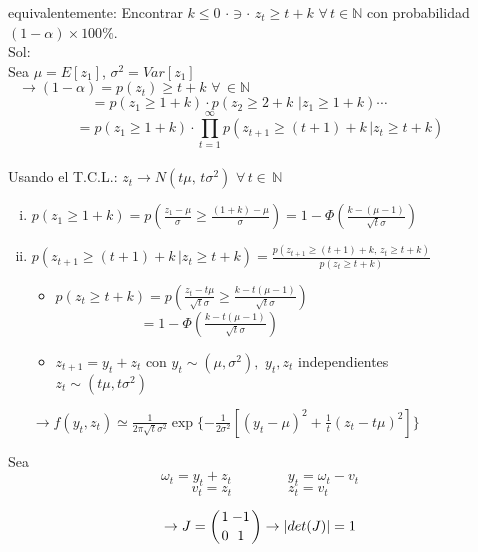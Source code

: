 equivalentemente: Encontrar $k\le 0\,\,\cdot\ni\cdot\,\,z_t\ge t+k\,\,\forall\,t\in\mathbb{N}$ con probabilidad $(1-\alpha)\times 100\%$.\\

Sol: \\
Sea $\mu=E[z_1]$, $\sigma^2=Var[z_1]$\\

\[\rightarrow (1-\alpha)=p(z_t)\ge t+k\,\,\forall\,\in\mathbb{N}\qquad\qquad\qquad\qquad\qquad\qquad\qquad\qquad\quad\quad\]
\[=p(z_1\ge 1+k)\cdot p(z_2\ge 2+k\,\,|z_1\ge 1+k)\cdots\qquad\quad\]
\[=p(z_1\ge 1+k)\cdot\displaystyle\prod_{t=1}^{\infty}p(z_{t+1}\ge (t+1)+k\,|z_t\ge t+k)\]\\

Usando el T.C.L.: $z_t \rightarrow N(t\mu,\,t\sigma^2)\,\,\forall\,t\in\,\mathbb{N}$

\begin{enumerate}[(i)]
 \item $p(z_1\ge 1+k)=p{\displaystyle\left(\frac{z_1-\mu}{\sigma}\ge\frac{(1+k)-\mu}{\sigma}\right)=1-\Phi\left(\frac{k-(\mu-1)}{\sqrt{t}\sigma}\right)}$\\
 
 \item $p(z_{t+1}\ge (t+1)+k\,|z_t\ge t+k)=\displaystyle\frac{p(z_{t+1}\ge (t+1)+k,\,z_t\ge t+k)}{p(z_t\ge t+k)}$\\
 
    \begin{itemize}
     \item $p(z_t\ge t+k)=p{\displaystyle\left(\frac{z_t-t\mu}{\sqrt{t}\sigma}\ge\frac{k-t(\mu-1)}{\sqrt{t}\sigma}\right)}$\\
     
     $\qquad\qquad\qquad={\displaystyle 1-\Phi\left(\frac{k-t(\mu-1)}{\sqrt{t}\sigma}\right)}$\\
     
     \item $z_{t+1}=y_t+z_t$ con $y_t \sim (\mu,\sigma^2),\,\,y_t,z_t$ independientes\\ $z_t\sim(t\mu,t\sigma^2)$
    \end{itemize}
$\rightarrow f(y_t,z_t)\simeq \displaystyle\frac{1}{2\pi\sqrt{t}\sigma^2}\exp\{-\frac{1}{2\sigma^2}[(y_t-\mu)^2+\frac{1}{t}(z_t-t\mu)^2]\}$
\end{enumerate}

Sea \[\omega_t=y_t+z_t\qquad\qquad y_t=\omega_t-v_t\]
\[v_t=z_t\qquad\qquad z_t=v_t\]

\[\rightarrow J=\left( {1\atop 0} {-1\atop {1}} \right)\rightarrow |det(J)|=1\]

